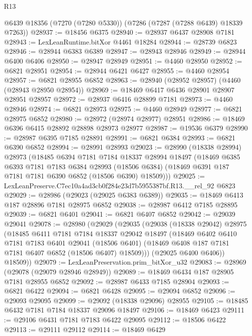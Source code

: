 \begin{lexlean}{R13}
\begin{coremodule}
    @6439
    @18356
    (@7270 (@7280 @5330))
    (@7286 (@7287 (@7288 @6439) @18339 @7263))
@28937 := @18456 @6375
@28940 := @28937 @6437 @28908 @7181
@28943 := LexLeanRuntime.bitXor @4461 @18284
@28944 := @28739 @6823
@28946 := @28944 @6383 @6389
@28947 := @28943 @28946
@28949 := @28944 @6400 @6406
@28950 := @28947 @28949
@28951 := @4460 @28950
@28952 := @6821 @28951
@28954 := @28944 @6421 @6427
@28955 := @4460 @28954
@28957 := @6821 @28955 @6852
@28963 := @28940 (@28952 @28957) (@4460 (@28943 @28950 @28954))
@28969 := @18469 @6417 @6436 @28901 @28907 @28951 @28957
@28972 := @28937 @6416 @28899 @7181
@28973 := @4460 @28946
@28974 := @6821 @28973
@28975 := @4460 @28949
@28977 := @6821 @28975 @6852
@28980 := @28972 (@28974 @28977) @28951
@28986 := @18469 @6396 @6415 @28892 @28898 @28973 @28977
@28987 := @19536 @6379
@28990 := @28987 @6395 @7185 @28891
@28991 := @6821 @6384
@28993 := @6821 @6390 @6852
@28994 := @28991 @28993
@29023 := @28990
    (@18338 @28994)
    @28973
    (@18485
      @6394
      @7181
      @7184
      @18337
      @28994
      @18497
      (@18469
        @6385
        @6393
        @7181
        @7183
        @6384
        @28993
        (@18506 @6384)
        (@18469 @6391 @187 @7181 @7181 @6390 @6852 (@18506 @6390) @18509)))
@29025 := LexLeanPreserve.C7ec10a4ad3cb0f284e23d7b5955387bf.R13.__rel_92 @6823
@29029 := @28986 (@29023 (@29025 @6383 @6389))
@29035 := @18469 @6413 @187 @28896 @7181 @28975 @6852
@29038 := @28987 @6412 @7185 @28895
@29039 := @6821 @6401
@29041 := @6821 @6407 @6852
@29042 := @29039 @29041
@29078 := @28980
    (@29029
      (@29035
        (@29038
          (@18338 @29042)
          @28975
          (@18485
            @6411
            @7181
            @7184
            @18337
            @29042
            @18497
            (@18469
              @6402
              @6410
              @7181
              @7183
              @6401
              @29041
              (@18506 @6401)
              (@18469 @6408 @187 @7181 @7181 @6407 @6852 (@18506 @6407) @18509)))
          (@29025 @6400 @6406))
        @18509))
@29079 := LexLeanPreservation.prim_bitXor_u32
@29083 := @28969 (@29078 (@29079 @28946 @28949))
@29089 := @18469 @6434 @187 @28905 @7181 @28955 @6852
@29092 := @28987 @6433 @7185 @28904
@29093 := @6821 @6422
@29094 := @6821 @6428
@29095 := @29094 @6852
@29096 := @29093 @29095
@29099 := @29092 (@18338 @29096) @28955
@29105 := @18485 @6432 @7181 @7184 @18337 @29096 @18497
@29106 := @18469 @6423
@29111 := @29106 @6431 @7181 @7183 @6422 @29095
@29112 := @18506 @6422
@29113 := @29111 @29112
@29114 := @18469 @6429

\end{coremodule}
\end{lexlean}
